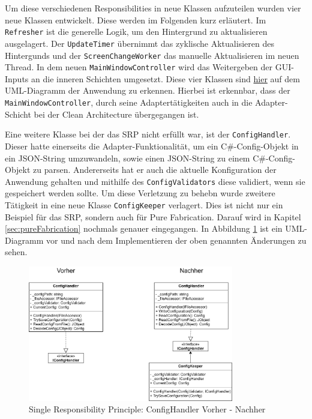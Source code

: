 Um diese verschiedenen Responsibilities in neue Klassen aufzuteilen wurden vier neue Klassen entwickelt. Diese werden im Folgenden kurz erläutert. Im \texttt{Refresher} ist die generelle Logik, um den Hintergrund zu aktualisieren ausgelagert. Der \texttt{UpdateTimer} übernimmt das zyklische Aktualisieren des Hintergunds und der \texttt{ScreenChangeWorker} das manuelle Aktualisieren im neuen Thread. In dem neuen \texttt{MainWindowController} wird das Weitergeben der GUI-Inputs an die inneren Schichten umgesetzt. Diese vier Klassen sind \href{https://github.com/Bronzila/WeatherWallpaper/blob/master/CleanArchitecturePics/Architektur_Vorher.jpg}{\color{blue}hier} auf dem UML-Diagramm der Anwendung zu erkennen. Hierbei ist erkennbar, dass der \texttt{MainWindowController}, durch seine Adaptertätigkeiten auch in die Adapter-Schicht bei der Clean Architecture übergegangen ist.

Eine weitere Klasse bei der das SRP nicht erfüllt war, ist der \texttt{ConfigHandler}. Dieser hatte einerseits die Adapter-Funktionalität, um ein C\#-Config-Objekt in ein JSON-String umzuwandeln, sowie einen JSON-String zu einem C\#-Config-Objekt zu parsen. Andererseits hat er auch die aktuelle Konfiguration der Anwendung gehalten und mithilfe des \texttt{ConfigValidators} diese validiert, wenn sie gespeichert werden sollte. Um diese Verletzung zu behebn wurde zweitere Tätigkeit in eine neue Klasse \texttt{ConfigKeeper} verlagert. Dies ist nicht nur ein Beispiel für das SRP, sondern auch für Pure Fabrication. Darauf wird in Kapitel \ref{sec:pureFabrication} nochmals genauer eingegangen. In Abbildung \ref{fig:ConfigHandlerSRP} ist ein UML-Diagramm vor und nach dem Implementieren der oben genannten Änderungen zu sehen.

\begin{figure}[ht]
\centering
\includegraphics[width=0.8\textwidth]{Bilder/ConfigHandlerSRP}
\caption[Single Responsibility Principle: ConfigHandler Vorher - Nachher]{\label{fig:ConfigHandlerSRP} Single Responsibility Principle: ConfigHandler Vorher - Nachher}
\end{figure}
